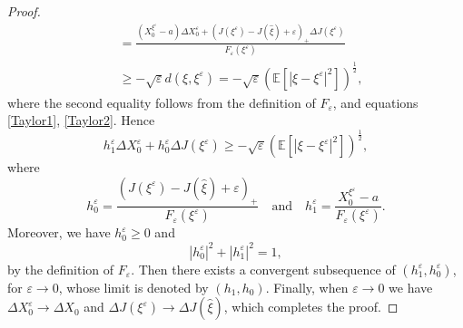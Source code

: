 \documentclass[11pt,a4paper]{article}
\begin{document}
\begin{proof}
\begin{align*}
    &=\frac{( X_0^{\xi^\varepsilon}-a) \Delta{X}^\varepsilon_0+ (J(\xi^\varepsilon)-J(\hat \xi)+\varepsilon)_+\Delta{J}(\xi^\varepsilon)}{F_\varepsilon(\xi^\varepsilon)}\\
    &\geq -\sqrt{\varepsilon}d(\xi,\xi^\varepsilon)=-\sqrt{\varepsilon}\left(\mathbb E\left[|\xi-\xi^\varepsilon|^2\right]\right)^\frac{1}{2},
\end{align*}
where the second equality follows from the definition of $F_\varepsilon$, and equations \eqref{Taylor1}, \eqref{Taylor2}.
Hence 
\begin{equation}
\label{optimality condition}
    h_1^\varepsilon \Delta{X}_0^\varepsilon+h_0^\varepsilon \Delta{J}(\xi^\varepsilon) \geq -\sqrt{\varepsilon}\left(\mathbb E \left[|\xi-\xi^\varepsilon|^2\right]\right)^\frac{1}{2},
\end{equation}
where $$h_0^\varepsilon =\frac{(J(\xi^\varepsilon)-J(\hat \xi)+\varepsilon)_+}{F_\varepsilon(\xi^\varepsilon)}\quad \textrm{and}\quad h_1^\varepsilon =\frac{X_0^{\xi^\varepsilon}-a}{F_\varepsilon(\xi^\varepsilon)}.$$
Moreover, we have  $h_0^\varepsilon \geq 0$ and
\[
|h_0^\varepsilon |^2+|h_1^\varepsilon|^2=1,
\]
by the definition of $F_\varepsilon$. Then there exists a convergent subsequence of $(h_1^\varepsilon,h_0^\varepsilon)$, for $\varepsilon \to 0$, whose limit is denoted by $(h_1,h_0)$. Finally, when $\varepsilon \to 0$ we have $\Delta{X}_0^\varepsilon \to \Delta{X}_0$ and $\Delta{J}(\xi^\varepsilon) \to \Delta{J}(\hat \xi)$, which completes the proof.
\end{proof}
\end{document}
